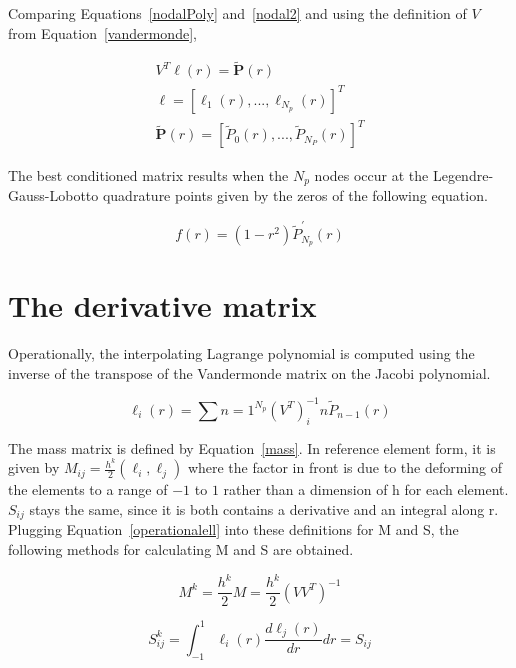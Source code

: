 \documentclass{article}
\begin{document}
Comparing Equations~\ref{nodalPoly} and~\ref{nodal2} and using the definition of $V$ from Equation~\ref{vandermonde}, 

\begin{eqnarray}
V^T\boldsymbol{\ell}(r)=\boldsymbol{\widetilde{P}}(r)\\
\boldsymbol{\ell} = [\ell_1(r), ..., \ell_{N_p}(r)]^T\\
\boldsymbol{\widetilde{P}}(r)=[\widetilde{P}_0(r),...,\widetilde{P}_{N_P}(r)]^T
\end{eqnarray}

The best conditioned matrix results when the $N_p$ nodes occur at the Legendre-Gauss-Lobotto quadrature points given by the zeros of the following equation.

\begin{equation}
f(r)=(1-r^2)\widetilde{P}^\prime_{N_p}(r)
\end{equation}

\section{The derivative matrix}
\label{derivative}

Operationally, the interpolating Lagrange polynomial is computed using
the inverse of the transpose of the Vandermonde matrix on the Jacobi
polynomial.

\begin{equation}
\ell_i(r)=\displaystyle\sum{n=1}^{N_p}(V^T)^{-1}_in\widetilde{P}_{n-1}(r)
\label{operationalell}
\end{equation}

The mass matrix is defined by Equation~\ref{mass}. In reference
element form, it is given by $M_{ij}=\frac{h^k}{2}(\ell_i,\ell_j)$
where the factor in front is due to the deforming of the elements to a
range of $-1$ to $1$ rather than a dimension of h for each
element. $S_{ij}$ stays the same, since it is both contains a derivative and
an integral along r. Plugging Equation~\ref{operationalell} into these definitions for M and S, the following methods for calculating M and S are obtained. 

\begin{equation}
M^k=\frac{h^k}{2}M=\frac{h^k}{2}(VV^T)^{-1}
\end{equation}

\begin{equation}
S^k_{ij}=\displaystyle\int_{-1}^1 \ell_i(r)\frac{d\ell_j(r)}{dr}dr=S_{ij}
\end{equation}
\end{document}
